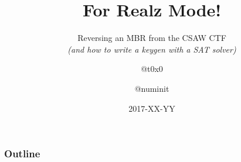\documentclass{beamer}
\title{For Realz Mode!}
\subtitle{
    Reversing an MBR from the CSAW CTF\\
    {\em (and how to write a keygen with a SAT solver)}
}
\author{@t0x0 \and @numinit}
\institute{\VaporSec}
\date{2017-XX-YY}
\begin{document}
\begin{frame}
    \titlepage
\end{frame}

\begin{frame}
    \frametitle{Outline}
    \tableofcontents[]
\end{frame}





\end{document}
